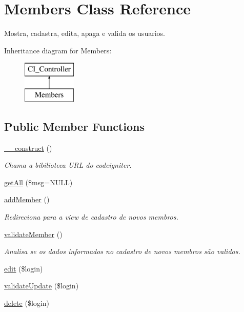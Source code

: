 \hypertarget{classMembers}{\section{Members Class Reference}
\label{classMembers}
}


Mostra, cadastra, edita, apaga e valida os usuarios.  


Inheritance diagram for Members\-:\begin{figure}[H]
\begin{center}
\leavevmode
\includegraphics[height=2.000000cm]{classMembers}
\end{center}
\end{figure}
\subsection*{Public Member Functions}
\begin{DoxyCompactItemize}
\item 
\hypertarget{classMembers_a6b8071cbd5837e99c283880ea9fdb695}{\hyperlink{classMembers_a6b8071cbd5837e99c283880ea9fdb695}{\-\_\-\-\_\-construct} ()}\label{classMembers_a6b8071cbd5837e99c283880ea9fdb695}

\begin{DoxyCompactList}\small\item\em Chama a bibilioteca U\-R\-L do codeigniter. \end{DoxyCompactList}\item 
\hyperlink{classMembers_a97543c7a9581814294ca85ccba384b64}{get\-All} (\$msg=N\-U\-L\-L)
\item 
\hyperlink{classMembers_ac2012deacee8545968300b8790b17664}{add\-Member} ()
\begin{DoxyCompactList}\small\item\em Redireciona para a view de cadastro de novos membros. \end{DoxyCompactList}\item 
\hyperlink{classMembers_a82f4446426e827d31bb951375ce64511}{validate\-Member} ()
\begin{DoxyCompactList}\small\item\em Analisa se os dados informados no cadastro de novos membros são validos. \end{DoxyCompactList}\item 
\hyperlink{classMembers_a587c1356d4e780d41a96cdbbee9c7fa9}{edit} (\$login)
\item 
\hyperlink{classMembers_a51f276a9b719cfb75b76c74806d2ece1}{validate\-Update} (\$login)
\item 
\hyperlink{classMembers_a2d5709b313f19375a6642d93b99c3661}{delete} (\$login)
\end{DoxyCompactItemize}


